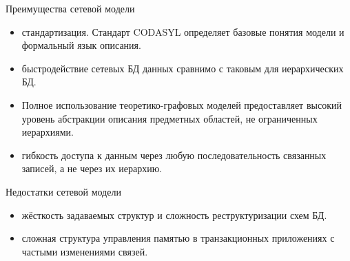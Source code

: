 \documentclass{beamer}
\begin{document}
\begin{frame}
\begin{block}{Преимущества сетевой модели}
\begin{itemize}
\item стандартизация. Стандарт CODASYL определяет базовые понятия модели и формальный язык описания.
\item быстродействие сетевых БД данных сравнимо с таковым для иерархических БД.
\item Полное использование теоретико-графовых моделей предоставляет высокий уровень абстракции описания предметных областей, не ограниченных иерархиями.
\item гибкость доступа к данным через любую последовательность связанных записей, а не через их иерархию.
\end{itemize}
\end{block}
\begin{block}{Недостатки сетевой модели}
\begin{itemize}
\item жёсткость задаваемых структур и сложность реструктуризации схем БД.
\item сложная структура управления памятью в транзакционных приложениях с частыми изменениями связей.
\end{itemize}
\end{block}
\end{frame}
\end{document}
